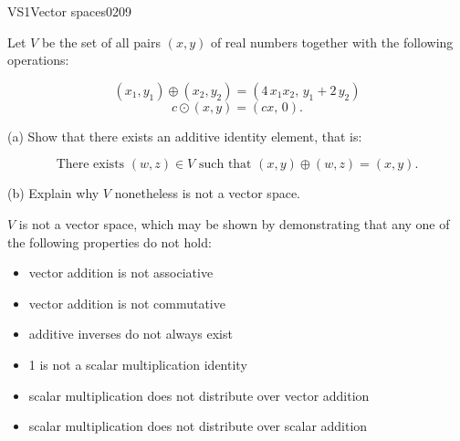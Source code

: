 \begin{exercise}{VS1}{Vector spaces}{0209} 
\begin{exerciseStatement} 

 Let \(V\) be the set of all pairs \((x,y)\) of real numbers together with the following operations: 

 \[(x_1,y_1)\oplus (x_2,y_2)=\left(4 \, x_{1} x_{2},\,y_{1} + 2 \, y_{2}\right)\]\[c \odot (x,y) =\left(c x,\,0\right).\] 

 (a) Show that there exists an additive identity element, that is: 

 \[
      \text{There exists }(w,z)\in V\text{ such that }(x,y)\oplus(w,z)=(x,y).
    \] 

 (b) Explain why \(V\) nonetheless is not a vector space. 

 \end{exerciseStatement}
 \begin{exerciseAnswer} 

 \(V\) is not a vector space, which may be shown by demonstrating that any one of the following properties do not hold: 

 

\begin{itemize}
\item vector addition is not associative
\item vector addition is not commutative
\item additive inverses do not always exist
\item 1 is not a scalar multiplication identity
\item scalar multiplication does not distribute over vector addition
\item scalar multiplication does not distribute over scalar addition
\end{itemize}

     \end{exerciseAnswer}
 \end{exercise}


\newpage




